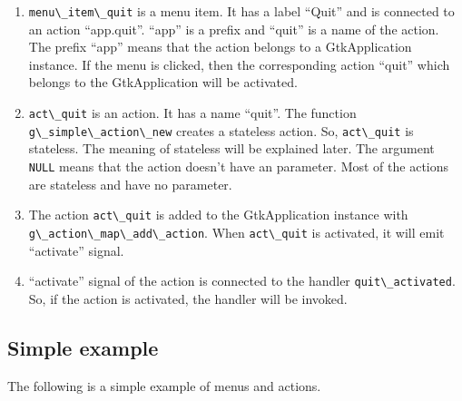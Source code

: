 \begin{enumerate}
\def\labelenumi{\arabic{enumi}.}
\tightlist
\item
  \passthrough{\lstinline!menu\_item\_quit!} is a menu item. It has a
  label ``Quit'' and is connected to an action ``app.quit''. ``app'' is
  a prefix and ``quit'' is a name of the action. The prefix ``app''
  means that the action belongs to a GtkApplication instance. If the
  menu is clicked, then the corresponding action ``quit'' which belongs
  to the GtkApplication will be activated.
\item
  \passthrough{\lstinline!act\_quit!} is an action. It has a name
  ``quit''. The function
  \passthrough{\lstinline!g\_simple\_action\_new!} creates a stateless
  action. So, \passthrough{\lstinline!act\_quit!} is stateless. The
  meaning of stateless will be explained later. The argument
  \passthrough{\lstinline!NULL!} means that the action doesn't have an
  parameter. Most of the actions are stateless and have no parameter.
\item
  The action \passthrough{\lstinline!act\_quit!} is added to the
  GtkApplication instance with
  \passthrough{\lstinline!g\_action\_map\_add\_action!}. When
  \passthrough{\lstinline!act\_quit!} is activated, it will emit
  ``activate'' signal.
\item
  ``activate'' signal of the action is connected to the handler
  \passthrough{\lstinline!quit\_activated!}. So, if the action is
  activated, the handler will be invoked.
\end{enumerate}

\hypertarget{simple-example}{%
\subsection{Simple example}\label{simple-example}}

The following is a simple example of menus and actions.

